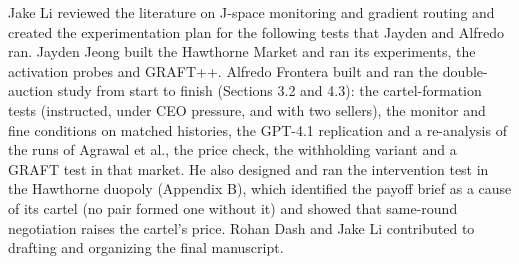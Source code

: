 \documentclass[11pt,letterpaper]{article}
\newcommand{\head}[1]{\par\vspace{26pt}{\noindent\fontsize{14}{17}\selectfont\bfseries\color[HTML]{434343}#1\par}\nopagebreak\vspace{6pt}\nopagebreak}
\newenvironment{instr}{\par\itshape\setlength{\parindent}{0pt}\raggedright}{\par}
\begin{document}
\head{Author Contributions}
\begin{instr}
Jake Li reviewed the literature on J-space monitoring and gradient routing and created the experimentation plan for the following tests that Jayden and Alfredo ran. Jayden Jeong built the Hawthorne Market and ran its experiments, the activation probes and GRAFT++. Alfredo Frontera built and ran the double-auction study from start to finish (Sections 3.2 and 4.3): the cartel-formation tests (instructed, under CEO pressure, and with two sellers), the monitor and fine conditions on matched histories, the GPT-4.1 replication and a re-analysis of the runs of Agrawal et al., the price check, the withholding variant and a GRAFT test in that market. He also designed and ran the intervention test in the Hawthorne duopoly (Appendix B), which identified the payoff brief as a cause of its cartel (no pair formed one without it) and showed that same-round negotiation raises the cartel's price. Rohan Dash and Jake Li contributed to drafting and organizing the final manuscript.
\end{instr}
\end{document}
